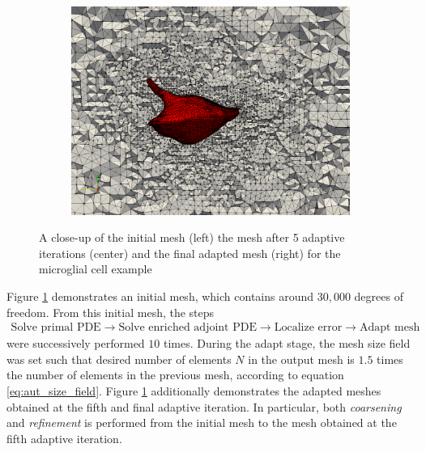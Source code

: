 \begin{figure}[ht!]
\begin{subfigure}{0.33\textwidth}
\includegraphics[width=.99\linewidth]{img/aut_glial_mesh10.png}
\end{subfigure}
\caption{A close-up of the initial mesh (left) the mesh after
5 adaptive iterations (center) and the final adapted mesh (right)
for the microglial cell example}
\label{fig:aut_glial_meshes}
\end{figure}

Figure \ref{fig:aut_glial_meshes} demonstrates an initial mesh,
which contains around $30,000$ degrees of freedom. From this initial
mesh, the steps
%
\begin{gather*}
\text{Solve primal PDE} \rightarrow
\text{Solve enriched adjoint PDE} \rightarrow
\text{Localize error} \rightarrow
\text{Adapt mesh}
\end{gather*}
%
were successively performed $10$ times. During the adapt stage,
the mesh size field was set such that desired number of elements
$N$ in the output mesh is $1.5$ times the number of elements
in the previous mesh, according to equation \eqref{eq:aut_size_field}.
Figure \ref{fig:aut_glial_meshes} additionally demonstrates the adapted
meshes obtained at the fifth and final adaptive iteration.
In particular, both \emph{coarsening} and \emph{refinement} is performed
from the initial mesh to the mesh obtained at the fifth adaptive iteration.

